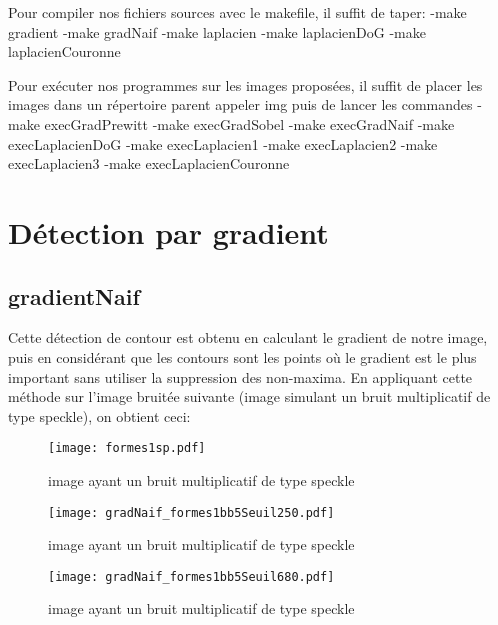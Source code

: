 \documentclass[12pt]{article}
\numberwithin{equation}{section}
\begin{document}
Pour compiler nos fichiers sources avec le makefile, il suffit de taper:
-make gradient
-make gradNaif
-make laplacien
-make laplacienDoG
-make laplacienCouronne

Pour exécuter nos programmes sur les images proposées, il suffit de placer les images dans un répertoire parent appeler img puis de lancer les commandes
-make execGradPrewitt
-make execGradSobel
-make execGradNaif
-make execLaplacienDoG
-make execLaplacien1
-make execLaplacien2
-make execLaplacien3
-make execLaplacienCouronne

\section{Détection par gradient}

\subsection{gradientNaif}

Cette détection de contour est obtenu en calculant le gradient de notre image, puis en considérant que les contours sont les points où le gradient est le plus important sans utiliser la suppression des non-maxima. En appliquant cette méthode sur l'image bruitée suivante (image simulant un bruit multiplicatif de type speckle), on obtient ceci:

	\begin{figure}[!ht]
        \begin{center}
           \texttt{[image: formes1sp.pdf]} 
           \caption{image ayant un bruit multiplicatif de type speckle}
        \end{center}
    \end{figure}

	\begin{figure}[!ht]
        \begin{center}
           \texttt{[image: gradNaif\_formes1bb5Seuil250.pdf]} 
           \caption{image ayant un bruit multiplicatif de type speckle}
        \end{center}
    \end{figure}

	\begin{figure}[!ht]
        \begin{center}
           \texttt{[image: gradNaif\_formes1bb5Seuil680.pdf]} 
           \caption{image ayant un bruit multiplicatif de type speckle}
        \end{center}
    \end{figure}
\end{document}
